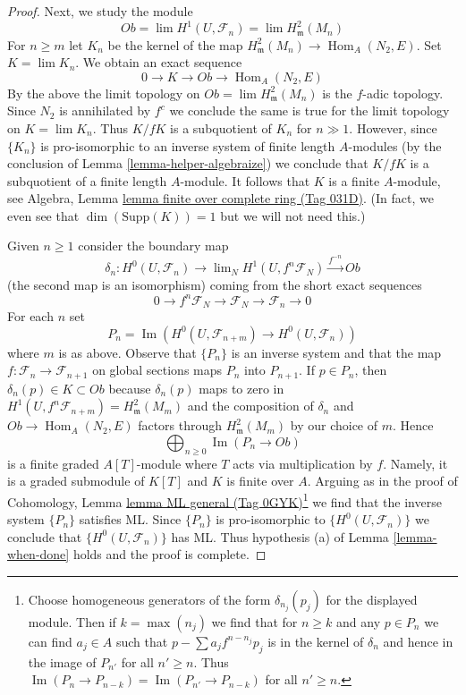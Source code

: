 \documentclass{amsart}
\theoremstyle{plain}
\theoremstyle{definition}
\theoremstyle{remark}
\numberwithin{equation}{subsection}
\def\lim{\mathop{\mathrm{lim}}\nolimits}
\def\Hom{\mathop{\mathrm{Hom}}\nolimits}
\def\Im{\mathop{\mathrm{Im}}}
\begin{document}
\begin{proof}
\medskip\noindent
Next, we study the module
$$
Ob = \lim H^1(U, \mathcal{F}_n) = \lim H^2_\mathfrak m(M_n)
$$
For $n \geq m$ let $K_n$ be the kernel of the map
$H^2_\mathfrak m(M_n) \to \Hom_A(N_2, E)$.
Set $K = \lim K_n$. We obtain an exact sequence
$$
0 \to K \to Ob \to \Hom_A(N_2, E)
$$
By the above the limit topology on $Ob = \lim H^2_\mathfrak m(M_n)$
is the $f$-adic topology. Since $N_2$ is annihilated by $f^c$
we conclude the same is true for the limit topology on $K = \lim K_n$.
Thus $K/fK$ is a subquotient of $K_n$ for $n \gg 1$.
However, since $\{K_n\}$ is pro-isomorphic to an inverse system of
finite length $A$-modules (by the conclusion of
Lemma \ref{lemma-helper-algebraize})
we conclude that $K/fK$ is a subquotient of a finite length
$A$-module. It follows that $K$ is a finite $A$-module, see
Algebra, Lemma \href{https://stacks.math.columbia.edu/tag/031D}{lemma finite over complete ring (Tag 031D)}.
(In fact, we even see that $\dim(\text{Supp}(K)) = 1$ but
we will not need this.)

\medskip\noindent
Given $n \geq 1$ consider the boundary map
$$
\delta_n :
H^0(U, \mathcal{F}_n)
\longrightarrow
\lim_N H^1(U, f^n\mathcal{F}_N) \xrightarrow{f^{-n}} Ob
$$
(the second map is an isomorphism)
coming from the short exact sequences
$$
0 \to f^n\mathcal{F}_N \to \mathcal{F}_N \to \mathcal{F}_n \to 0
$$
For each $n$ set
$$
P_n = \Im(H^0(U, \mathcal{F}_{n + m}) \to H^0(U, \mathcal{F}_n))
$$
where $m$ is as above. Observe that $\{P_n\}$ is an inverse
system and that the map $f : \mathcal{F}_n \to \mathcal{F}_{n + 1}$
on global sections maps $P_n$ into $P_{n + 1}$.
If $p \in P_n$, then $\delta_n(p) \in K \subset Ob$
because $\delta_n(p)$ maps to zero in
$H^1(U, f^n\mathcal{F}_{n + m}) = H^2_\mathfrak m(M_m)$
and the composition of $\delta_n$ and $Ob \to \Hom_A(N_2, E)$
factors through $H^2_\mathfrak m(M_m)$ by our choice of $m$.
Hence
$$
\bigoplus\nolimits_{n \geq 0} \Im(P_n \to Ob)
$$
is a finite graded $A[T]$-module where $T$ acts via multiplication by $f$.
Namely, it is a graded submodule of $K[T]$ and $K$ is finite over $A$.
Arguing as in the proof of
Cohomology, Lemma \href{https://stacks.math.columbia.edu/tag/0GYK}{lemma ML general (Tag 0GYK)}\footnote{Choose
homogeneous generators of the form $\delta_{n_j}(p_j)$ for the displayed
module. Then if $k = \max(n_j)$ we find that for $n \geq k$
and any $p \in P_n$ we can find $a_j \in A$ such that
$p - \sum a_j f^{n - n_j} p_j$ is in the kernel of $\delta_n$
and hence in the image of $P_{n'}$ for all $n' \geq n$.
Thus $\Im(P_n \to P_{n - k}) = \Im(P_{n'} \to P_{n - k})$
for all $n' \geq n$.}
we find that the inverse system $\{P_n\}$ satisfies ML.
Since $\{P_n\}$ is pro-isomorphic to $\{H^0(U, \mathcal{F}_n)\}$
we conclude that $\{H^0(U, \mathcal{F}_n)\}$ has ML.
Thus hypothesis (a) of Lemma \ref{lemma-when-done}
holds and the proof is complete.
\end{proof}
\end{document}

